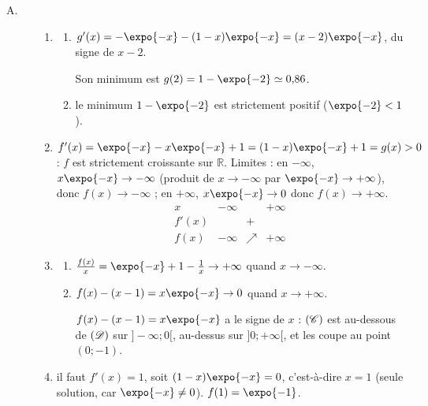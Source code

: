 	\begin{description}
		\item[A.]
			\begin{enumerate}
				\item \begin{enumerate}
					\item {}
						$g'(x) = -\expo{-x} - (1-x)\expo{-x} = (x-2)\expo{-x}$, du signe de $x - 2$.

						\ansbox{$g$ est décroissante sur $]-\infty;2]$ et croissante sur $[2;+\infty[$.}

						Son minimum est $g(2) = 1 - \expo{-2} \simeq 0{,}86$.
					\item {} le minimum $1 - \expo{-2}$ est strictement positif ($\expo{-2} < 1$).

				\end{enumerate}
				\item {}
					$f'(x) = \expo{-x} - x\expo{-x} + 1 = (1-x)\expo{-x} + 1 = g(x) > 0$ : $f$ est strictement croissante sur $\mathbb{R}$.
					Limites : en $-\infty$, $x\expo{-x} \to -\infty$ (produit de $x \to -\infty$ par $\expo{-x} \to +\infty$), donc $f(x) \to -\infty$ ;
					en $+\infty$, $x\expo{-x} \to 0$ donc $f(x) \to +\infty$.
					\[
					\begin{array}{c|ccc}
						x & -\infty & & +\infty \\ \hline
						f'(x) & & + & \\ \hline
						f(x) & -\infty & \nearrow & +\infty
					\end{array}
					\]
				\item \begin{enumerate}
					\item {}
						$\frac{f(x)}{x} = \expo{-x} + 1 - \frac{1}{x} \to +\infty$ quand $x \to -\infty$.

					\item {}
						$f(x) - (x-1) = x\expo{-x} \to 0$ quand $x \to +\infty$.


						 $f(x) - (x-1) = x\expo{-x}$ a le signe de $x$ :
						$(\mathscr{C})$ est au-dessous de $(\mathscr{D})$ sur $]-\infty;0[$, au-dessus sur $]0;+\infty[$, et les coupe au point $(0;-1)$.
				\end{enumerate}
				\item {}
					il faut $f'(x) = 1$, soit $(1-x)\expo{-x} = 0$, c'est-à-dire $x = 1$ (seule solution, car $\expo{-x} \neq 0$).
					$f(1) = \expo{-1}$.


\end{enumerate}
\end{description}

